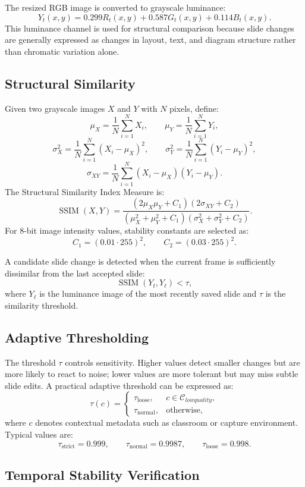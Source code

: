 \documentclass[11pt]{article}
\begin{document}
The resized RGB image is converted to grayscale luminance:
\[
Y_t(x,y) = 0.299R_t(x,y) + 0.587G_t(x,y) + 0.114B_t(x,y).
\]
This luminance channel is used for structural comparison because slide changes are generally expressed as changes in layout, text, and diagram structure rather than chromatic variation alone.

\subsection{Structural Similarity}

Given two grayscale images $X$ and $Y$ with $N$ pixels, define:
\[
\mu_X = \frac{1}{N}\sum_{i=1}^{N}X_i, \qquad
\mu_Y = \frac{1}{N}\sum_{i=1}^{N}Y_i,
\]
\[
\sigma_X^2 = \frac{1}{N}\sum_{i=1}^{N}(X_i-\mu_X)^2, \qquad
\sigma_Y^2 = \frac{1}{N}\sum_{i=1}^{N}(Y_i-\mu_Y)^2,
\]
\[
\sigma_{XY} = \frac{1}{N}\sum_{i=1}^{N}(X_i-\mu_X)(Y_i-\mu_Y).
\]
The Structural Similarity Index Measure is:
\[
\operatorname{SSIM}(X,Y)
=
\frac{(2\mu_X\mu_Y+C_1)(2\sigma_{XY}+C_2)}
{(\mu_X^2+\mu_Y^2+C_1)(\sigma_X^2+\sigma_Y^2+C_2)}.
\]
For 8-bit image intensity values, stability constants are selected as:
\[
C_1=(0.01\cdot255)^2, \qquad C_2=(0.03\cdot255)^2.
\]

A candidate slide change is detected when the current frame is sufficiently dissimilar from the last accepted slide:
\[
\operatorname{SSIM}(Y_t,Y_{\ell}) < \tau,
\]
where $Y_{\ell}$ is the luminance image of the most recently saved slide and $\tau$ is the similarity threshold.

\subsection{Adaptive Thresholding}

The threshold $\tau$ controls sensitivity. Higher values detect smaller changes but are more likely to react to noise; lower values are more tolerant but may miss subtle slide edits. A practical adaptive threshold can be expressed as:
\[
\tau(c)=
\begin{cases}
\tau_{\text{loose}}, & c \in \mathcal{C}_{lowquality},\\
\tau_{\text{normal}}, & \text{otherwise},
\end{cases}
\]
where $c$ denotes contextual metadata such as classroom or capture environment. Typical values are:
\[
\tau_{\text{strict}}=0.999,\qquad
\tau_{\text{normal}}=0.9987,\qquad
\tau_{\text{loose}}=0.998.
\]

\subsection{Temporal Stability Verification}
\end{document}
